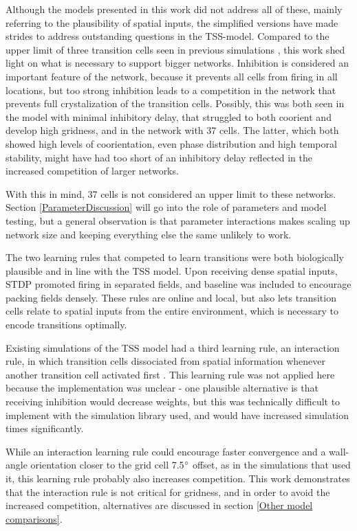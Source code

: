 \documentclass{article}
\begin{document}
    Although the models presented in this work did not address all of these, mainly referring to the plausibility of spatial inputs, the simplified versions have made strides to address outstanding questions in the TSS-model. Compared to the upper limit of three transition cells seen in previous simulations \parencite{Waniek2017}, this work shed light on what is necessary to support bigger networks. Inhibition is considered an important feature of the network, because it prevents all cells from firing in all locations, but too strong inhibition leads to a competition in the network that prevents full crystalization of the transition cells. Possibly, this was both seen in the model with minimal inhibitory delay, that struggled to both coorient and develop high gridness, and in the network with 37 cells. The latter, which both showed high levels of coorientation, even phase distribution and high temporal stability, might have had too short of an inhibitory delay reflected in the increased competition of larger networks.

    With this in mind, 37 cells is not considered an upper limit to these networks. Section \ref{ParameterDiscussion} will go into the role of parameters and model testing, but a general observation is that parameter interactions makes scaling up network size and keeping everything else the same unlikely to work. 

    The two learning rules that competed to learn transitions were both biologically plausible and in line with the TSS model. Upon receiving dense spatial inputs, STDP promoted firing in separated fields, and baseline was included to encourage packing fields densely. These rules are online and local, but also lets transition cells relate to spatial inputs from the entire environment, which is necessary to encode transitions optimally.
    
    Existing simulations of the TSS model had a third learning rule, an interaction rule, in which transition cells dissociated from spatial information whenever another transition cell activated first \parencite{Waniek2017}. This learning rule was not applied here because the implementation was unclear - one plausible alternative is that receiving inhibition would decrease weights, but this was technically difficult to implement with the simulation library used, and would have increased simulation times significantly. 
    
    While an interaction learning rule could encourage faster convergence and a wall-angle orientation closer to the grid cell 7.5\(\degree\) offset, as in the simulations that used it, this learning rule probably also increases competition. This work demonstrates that the interaction rule is not critical for gridness, and in order to avoid the increased competition, alternatives are discussed in section \ref{Other model comparisons}.
    
\end{document}
